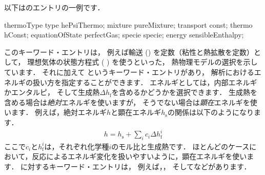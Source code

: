 以下はのエントリの一例です．
\begin{OFverbatim}[file]
thermoType
{
    type            hePsiThermo;
    mixture         pureMixture;
    transport       const;
    thermo          hConst;
    equationOfState perfectGas;
    specie          specie;
    energy          sensibleEnthalpy;
}
\end{OFverbatim}
このキーワード・エントリは，
例えば輸送 () を定数（粘性と熱拡散を定数）として，
理想気体の状態方程式 (%
%
%
) を使うといった，
熱物理モデルの選択を示しています．
それに加えて
%
%
というキーワード・エントリがあり，
解析におけるエネルギの扱い方を指定することができます．
エネルギとしては，内部エネルギかエンタルピ，
そして生成熱$\Delta h_{\mathrm{f}}$を含めるかどうかを選択できます．
生成熱を含める場合は\emph{絶対}エネルギを使いますが，
そうでない場合は\emph{顕在}エネルギを使います．
例えば，絶対エネルギ$h$と顕在エネルギ$h_{\mathrm{s}}$の関係は以下のようになります．
\begin{align}
 \label{eq:7.1@2.2.0}
 h = h_{\mathrm{s}} + \sum_{i}c_{i}\Delta h_{\mathrm{f}}^{i}
\end{align}
ここで$c_{i}$と$h_{\mathrm{f}}^{i}$は，それぞれ化学種$i$のモル比と生成熱です．
ほとんどのケースにおいて，反応によるエネルギ変化を扱いやすいように，顕在エネルギを使います．
%
%
に対するキーワード・エントリは，
例えば，，
そしてなどがあります．


